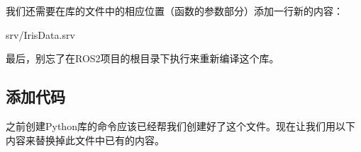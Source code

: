 \documentclass[letterpaper,10pt,english]{sphinxmanual}
\begin{document}
\sphinxAtStartPar
我们还需要在库的文件中的相应位置（函数的参数部分）添加一行新的内容：

\begin{sphinxVerbatim}[commandchars=\\\{\}]
\PYGZdq{}srv/IrisData.srv\PYGZdq{}
\end{sphinxVerbatim}

\sphinxAtStartPar
最后，别忘了在ROS2项目的根目录下执行来重新编译这个库。


\subsection{添加代码}
\label{\detokenize{chapter_rl_sys/planning_code_ex:id5}}
\sphinxAtStartPar
之前创建Python库的命令应该已经帮我们创建好了这个文件。现在让我们用以下内容来替换掉此文件中已有的内容。
\end{document}

